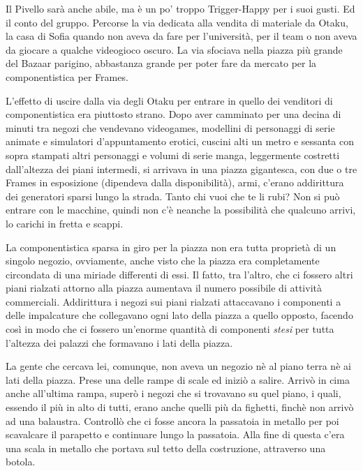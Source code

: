     Il Pivello sarà anche abile, ma è un po' troppo Trigger-Happy per i suoi gusti. Ed il conto del gruppo. Percorse
    la via dedicata alla vendita di materiale da Otaku, la casa di Sofia quando non aveva da fare per l'università, per
    il team o non aveva da giocare a qualche videogioco oscuro. La via sfociava nella piazza più grande del Bazaar
    parigino, abbastanza grande per poter fare da mercato per la componentistica per Frames.

    L'effetto di uscire dalla via degli Otaku per entrare in quello dei venditori di componentistica era piuttosto
    strano. Dopo aver camminato per una decina di minuti tra negozi che vendevano videogames, modellini di personaggi di
    serie animate e simulatori d'appuntamento erotici, cuscini alti un metro e sessanta con sopra stampati altri
    personaggi e volumi di serie manga, leggermente costretti dall'altezza dei piani intermedi, si arrivava in una
    piazza gigantesca, con due o tre Frames in esposizione (dipendeva dalla disponibilità), armi, c'erano addirittura
    dei generatori sparsi lungo la strada. Tanto chi vuoi che te li rubi? Non si può entrare con le macchine, quindi non
    c'è neanche la possibilità che qualcuno arrivi, lo carichi in fretta e scappi.

    La componentistica sparsa in giro per la piazza non era tutta proprietà di un singolo negozio, ovviamente, anche
    visto che la piazza era completamente circondata di una miriade differenti di essi. Il fatto, tra l'altro, che ci
    fossero altri piani rialzati attorno alla piazza aumentava il numero possibile di attività commerciali. Addirittura
    i negozi sui piani rialzati attaccavano i componenti a delle impalcature che collegavano ogni lato della piazza a
    quello opposto, facendo così in modo che ci fossero un'enorme quantità di componenti \emph{stesi} per tutta
    l'altezza dei palazzi che formavano i lati della piazza.

    La gente che cercava lei, comunque, non aveva un negozio nè al piano terra nè ai lati della piazza. Prese una delle
    rampe di scale ed iniziò a salire. Arrivò in cima anche all'ultima rampa, superò i negozi che si trovavano su quel
    piano, i quali, essendo il più in alto di tutti, erano anche quelli più da fighetti, finchè non arrivò ad una
    balaustra. Controllò che ci fosse ancora la passatoia in metallo per poi scavalcare il parapetto e continuare lungo
    la passatoia. Alla fine di questa c'era una scala in metallo che portava sul tetto della costruzione, attraverso una
    botola.

